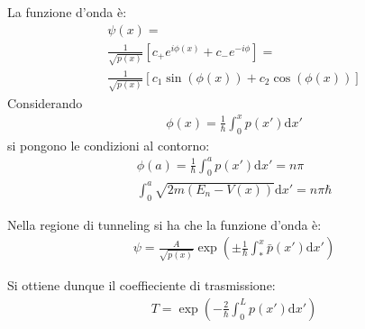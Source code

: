 La funzione d'onda è:
\begin{equation}\begin{split}
\psi \left(x\right)=\\
\frac{1}{\sqrt{p\left(x\right)}}\left[c_+e^{i\phi\left(x\right)}+c_-e^{-i\phi}\right]=\\
\frac{1}{\sqrt{p\left(x\right)}}\left[c_1\sin{\left(\phi\left(x\right)\right)}+c_2\cos{\left(\phi\left(x\right)\right)}\right]
\end{split}\end{equation}
Considerando
\begin{equation}\begin{split}
\phi\left(x\right)=\frac{1}{\hbar }\int_0^x{p\left(x'\right)\textrm{d}x'}
\end{split}\end{equation}
si pongono le condizioni al contorno:
\begin{equation}\begin{split}
\phi\left(a\right)=\frac{1}{\hbar }\int_0^a{p\left(x'\right)\textrm{d}x'}=n\pi\\
\int_0^a{\sqrt{2m\left(E_n-V\left(x\right)\right)}\textrm{d}x'}=n\pi\hbar 
\end{split}\end{equation}

Nella regione di tunneling si ha che la funzione d'onda è:
\begin{equation}\begin{split}
\psi =\frac{A}{\sqrt{p\left(x\right)}}\exp{\left(\pm\frac{1}{\hbar }\int_*^x{\bar p\left(x'\right)\textrm{d}x'}\right)}
\end{split}\end{equation}


Si ottiene dunque il coeffieciente di trasmissione:
\begin{equation}\begin{split}
T=\exp{\left(-\frac{2}{\hbar }\int_0^L{p\left(x'\right)\textrm{d}x'}\right)}
\end{split}\end{equation}